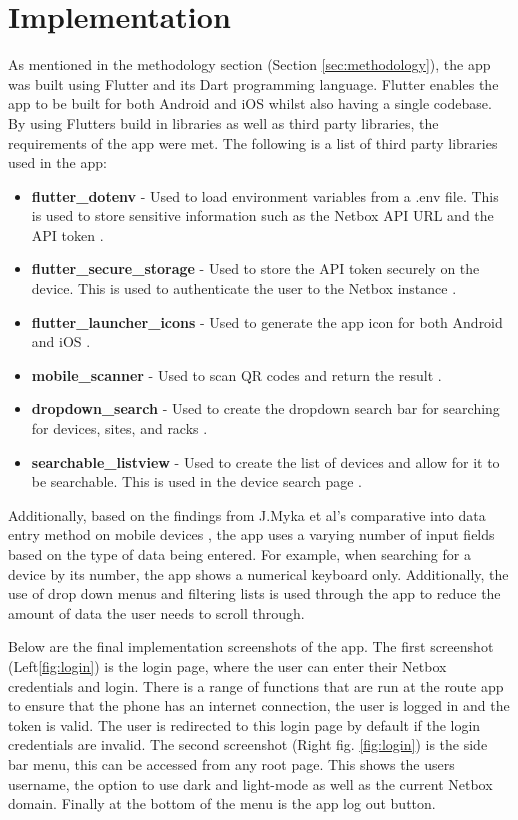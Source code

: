 \documentclass [11pt,a4paper]{article}
\begin{document}
\section{Implementation}
\label{sec:implementation}
As mentioned in the methodology section (Section \ref{sec:methodology}), the app was built using Flutter and its Dart programming language. Flutter enables the app to be built for both Android and iOS whilst also having a single codebase. By using Flutters build in libraries as well as third party libraries, the requirements of the app were met. The following is a list of third party libraries used in the app:
\begin{itemize}
    \item \textbf{flutter\_dotenv} - Used to load environment variables from a .env file. This is used to store sensitive information such as the Netbox API URL and the API token \cite{dot_env}.
    \item \textbf{flutter\_secure\_storage} - Used to store the API token securely on the device. This is used to authenticate the user to the Netbox instance \cite{secure_sec}.
    \item \textbf{flutter\_launcher\_icons} - Used to generate the app icon for both Android and iOS \cite{icon_launch}.
    \item \textbf{mobile\_scanner} - Used to scan QR codes and return the result \cite{barcodeScannerPlugin}.
    \item \textbf{dropdown\_search} - Used to create the dropdown search bar for searching for devices, sites, and racks \cite{dropdown}.
    \item \textbf{searchable\_listview} - Used to create the list of devices and allow for it to be searchable. This is used in the device search page \cite{searchable}. 
\end{itemize}

Additionally, based on the findings from J.Myka et al's comparative into data entry method on mobile devices \cite{myka2019comparative}, the app uses a varying number of input fields based on the type of data being entered. For example, when searching for a device by its number, the app shows a numerical keyboard only. Additionally, the use of drop down menus and filtering lists is used through the app to reduce the amount of data the user needs to scroll through.

Below are the final implementation screenshots of the app. The first screenshot (Left\ref{fig:login}) is the login page, where the user can enter their Netbox credentials and login. There is a range of functions that are run at the route app to ensure that the phone has an internet connection, the user is logged in and the token is valid. The user is redirected to this login page by default if the login credentials are invalid. The second screenshot (Right fig. \ref{fig:login}) is the side bar menu, this can be accessed from any root page. This shows the users username, the option to use dark and light-mode as well as the current Netbox domain. Finally at the bottom of the menu is the app log out button.
\end{document}
